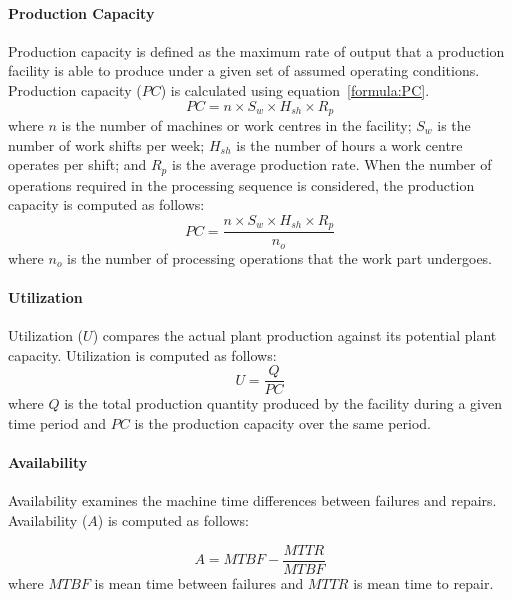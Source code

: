 \paragraph{Production Capacity}
Production capacity is defined as the maximum rate of output that a production facility is able to produce under a given set of assumed operating conditions. Production capacity ($PC$) is calculated using equation~\ref{formula:PC}.
\begin{equation}
\label{formula:PC}
PC = n\times S_w\times H_{sh}\times R_p
\end{equation}
where $n$ is the number of machines or work centres in the facility; $S_w$ is the number of work shifts per week; $H_{sh}$ is the number of hours a work centre operates per shift; and $R_p$ is the average production rate. When the number of operations required in the processing sequence is considered, the production capacity is computed as follows:
\begin{equation}
PC = \frac{n\times S_w\times H_{sh}\times R_p}{n_o}
\end{equation}
where $n_o$ is the number of processing operations that the work part undergoes.

\paragraph{Utilization}
Utilization ($U$) compares the actual plant production against its potential plant capacity. Utilization is computed as follows:
\begin{equation}
U=\frac{Q}{PC}
\end{equation}
where $Q$ is the total production quantity produced by the facility during a given time period and $PC$ is the production capacity over the same period.
\paragraph{Availability}
Availability examines the machine time differences between failures and repairs. Availability ($A$) is computed as follows:

\begin{equation}
A=MTBF-\frac{MTTR}{MTBF}
\end{equation}
where $MTBF$ is mean time between failures and $MTTR$ is mean time to repair.

